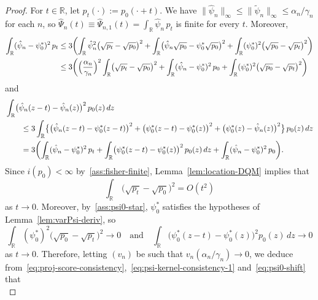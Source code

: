 \documentclass[a4paper]{article}
\newcommand{\R}{\mathbb{R}}
\newcommand{\norm}[1]{\|{#1}\|}
\theoremstyle{definition}
\begin{document}
\begin{proof}
For $t \in \R$, let $p_t(\cdot) := p_0(\cdot + t)$. We have $\norm{\hat{\psi}_n}_\infty \leq \norm{\tilde{\psi}_n}_\infty \leq \alpha_n/\gamma_n$ for each $n$, so $\hat{\Psi}_n(t) \equiv\hat{\Psi}_{n,1}(t) = \int_\R \hat{\psi}_n\,p_t$ is finite for every $t$. Moreover,
\begin{align}
\int_\R (\hat{\psi}_n - \psi_0^*)^2\,p_t
&\leq 3\biggl(\int_\R \hat{\psi}_n^2\bigl(\sqrt{p_t} - \sqrt{p_0}\bigr)^2 + \int_\R \bigl(\hat{\psi}_n\sqrt{p_0} - \psi_0^*\sqrt{p_0}\bigr)^2 + \int_\R (\psi_0^*)^2\bigl(\sqrt{p_0} - \sqrt{p_t}\bigr)^2\biggr) \notag \\
\label{eq:psi-kernel-consistency-1}
&\leq 3\biggl(\Bigl(\frac{\alpha_n}{\gamma_n}\Bigr)^2 \int_\R \bigl(\sqrt{p_t} - \sqrt{p_0}\bigr)^2 + \int_\R (\hat{\psi}_n - \psi_0^*)^2\,p_0 + \int_\R (\psi_0^*)^2\bigl(\sqrt{p_0} - \sqrt{p_t}\bigr)^2\biggr)
\end{align}
and
\begin{align}
&\int_\R \bigl(\hat{\psi}_n(z - t) - \hat{\psi}_n(z)\bigr)^2\,p_0(z)\,dz \notag \\
&\qquad\leq 3\int_\R \bigl\{\bigl(\hat{\psi}_n(z - t) - \psi_0^*(z - t)\bigr)^2 + \bigl(\psi_0^*(z - t) - \psi_0^*(z)\bigr)^2 + \bigl(\psi_0^*(z) - \hat{\psi}_n(z)\bigr)^2\bigr\}\,p_0(z)\,dz \notag \\
\label{eq:psi-kernel-consistency-2}
&\qquad= 3\biggl(\int_\R (\hat{\psi}_n - \psi_0^*)^2\,p_t + \int_\R \bigl(\psi_0^*(z - t) - \psi_0^*(z)\bigr)^2\,p_0(z)\,dz + \int_\R (\hat{\psi}_n - \psi_0^*)^2\,p_0\biggr).
\end{align}
Since $i(p_0) < \infty$ by~\ref{ass:fisher-finite}, Lemma~\ref{lem:location-DQM} implies that 
\begin{equation}
\label{eq:location-DQM-hellinger}
\int_\R \,\bigl(\sqrt{p_t} - \sqrt{p_0}\bigr)^2 = O(t^2)
\end{equation}
as $t \to 0$. Moreover, by~\ref{ass:psi0-star}, $\psi_0^*$ satisfies the hypotheses of Lemma~\ref{lem:varPsi-deriv}, so
\begin{equation}
\label{eq:psi0-shift}
\int_\R (\psi_0^*)^2\bigl(\sqrt{p_0} - \sqrt{p_t}\bigr)^2 \to 0 \quad\text{and}\quad \int_\R \bigl(\psi_0^*(z - t) - \psi_0^*(z)\bigr)^2 p_0(z)\,dz \to 0
\end{equation}
as $t \to 0$. Therefore, letting $(v_n)$ be such that $v_n(\alpha_n/\gamma_n) \to 0$, we deduce from~\eqref{eq:proj-score-consistency},~\eqref{eq:psi-kernel-consistency-1} and~\eqref{eq:psi0-shift} that
\begin{equation}
\label{eq:psi-kernel-consistency-3}

\end{equation}
\end{proof}
\end{document}
